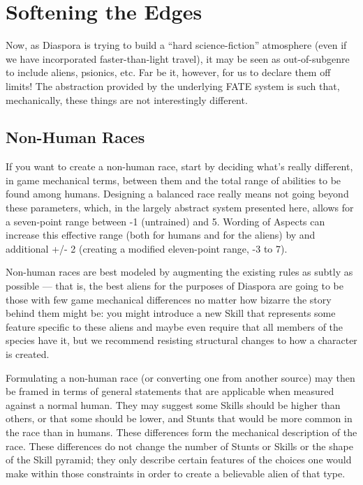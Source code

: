 \section{Softening the Edges}\label{sec:Softening the Edges}

Now, as Diaspora is trying to build a ``hard science-fiction'' atmosphere (even if we have incorporated faster-than-light travel), it may be seen as out-of-subgenre to include aliens, psionics, etc. Far be it, however, for us to declare them off limits! The abstraction provided by the underlying FATE system is such that, mechanically, these things are not interestingly different.


\subsection{Non-Human Races}\label{sec:Non-Human Races}

If you want to create a non-human race, start by deciding what's really different, in game mechanical terms, between them and the total range of abilities to be found among humans. Designing a balanced race really means not going beyond these parameters, which, in the largely abstract system presented here, allows for a seven-point range between -1 (untrained) and 5. Wording of Aspects can increase this effective range (both for humans and for the aliens) by and additional +/- 2 (creating a modified eleven-point range, -3 to 7).

Non-human races are best modeled by augmenting the existing rules as subtly as possible --- that is, the best aliens for the purposes of Diaspora are going to be those with few game mechanical differences no matter how bizarre the story behind them might be: you might introduce a new Skill that represents some feature specific to these aliens and maybe even require that all members of the species have it, but we recommend resisting structural changes to how a character is created.

Formulating a non-human race (or converting one from another source) may then be framed in terms of general statements that are applicable when measured against a normal human. They may suggest some Skills should be higher than others, or that some should be lower, and Stunts that would be more common in the race than in humans. These differences form the mechanical description of the race. These differences do not change the number of Stunts or Skills or the shape of the Skill pyramid; they only describe certain features of the choices one would make within those constraints in order to create a believable alien of that type.

